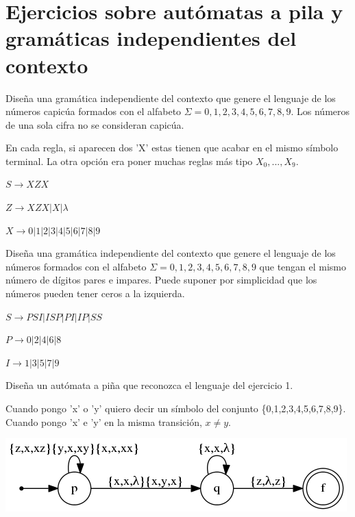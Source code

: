  \newpage

 
 
 
 
 \section{Ejercicios sobre autómatas a pila y gramáticas independientes del contexto}
 
 \begin{problem}[1]
 Diseña una gramática independiente del contexto que genere el lenguaje de los números capicúa formados con el alfabeto $\Sigma = {0,1,2,3,4,5,6,7,8,9} $. Los números de una sola cifra no se consideran capicúa.
 

 \solution
 
 
  En cada regla, si aparecen dos 'X' estas tienen que acabar en el mismo símbolo terminal. La otra opción era poner muchas reglas más tipo $X_0,...,X_9$.
  
  $S \longrightarrow XZX$
  
  $Z \longrightarrow XZX|X|\lambda$
  
  $X\longrightarrow 0|1|2|3|4|5|6|7|8|9$
 
 \end{problem}
 
 \begin{problem}[2]
 Diseña una gramática independiente del contexto que genere el lenguaje de los números formados con el alfabeto $\Sigma = {0,1,2,3,4,5,6,7,8,9} $ que tengan el mismo número de dígitos pares e impares. Puede suponer por simplicidad que los números pueden tener ceros a la izquierda.
 
 
 \solution
 $S \longrightarrow PSI|ISP|PI|IP|SS$
 
  $P \longrightarrow 0|2|4|6|8$
  
  $I \longrightarrow 1|3|5|7|9$
  
  
 
 \end{problem}
 
 \begin{problem}[3]
Diseña un autómata a piña que reconozca el lenguaje del ejercicio 1.
 
 
 \solution
 \begin{expla}
 Cuando pongo 'x' o 'y' quiero decir un símbolo del conjunto \{0,1,2,3,4,5,6,7,8,9\}. Cuando pongo 'x' e 'y' en la misma transición, $x \neq y$.
 \end{expla}
 \begin{center}
  \includegraphics[scale=0.75]{tex/ejerciciosHoja1/automata_7.png}
  \end{center}
 
 \end{problem}
 
